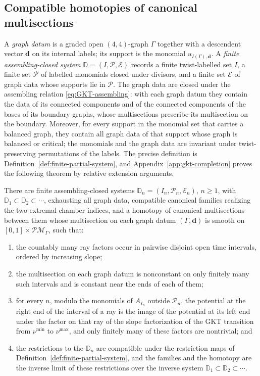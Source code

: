 \subsection{Compatible homotopies of canonical multisections}

A \emph{graph datum} is a graded open $(4,4)$-graph $\Gamma$ together
with a descendent vector $\mathbf d$ on its internal labels; its support is
the monomial $u_{I(\Gamma),\mathbf d}$.  A \emph{finite assembling-closed
system} $\mathbb D=(I,\mathscr P,\mathcal E)$ records a finite twist-labelled
set $I$, a finite set $\mathscr P$ of labelled monomials closed under divisors, and a
finite set $\mathcal E$ of graph data whose supports lie in $\mathscr P$.  The graph
data are closed under the assembling relation \eqref{eq:GKT-assembling}:
with each graph datum they contain the data of its connected components and
of the connected components of the bases of its boundary graphs, whose
multisections prescribe its multisection on the boundary.  Moreover, for
every support in
the monomial set that carries a balanced graph, they contain all graph data
of that support whose graph is balanced or critical; the monomials and the
graph data are invariant under twist-preserving permutations of the labels.
The precise definition is
Definition~\ref{def:finite-partial-system}, and
Appendix~\ref{app:gkt-completion} proves the following theorem by relative
extension arguments.

\begin{theorem}
\label{thm:compatible-GKT-realization}
There are finite assembling-closed systems
$\mathbb D_n=(I_n,\mathscr P_n,\mathcal E_n)$, $n\geq1$, with
$\mathbb D_1\subset\mathbb D_2\subset\cdots$, exhausting all graph data,
compatible canonical families realizing the two extremal chamber indices,
and a homotopy of canonical multisections between them whose multisection
on each graph datum $(\Gamma,\mathbf d)$ is smooth on
$[0,1]\times\mathcal{PM}_\Gamma$, such that:
\begin{enumerate}
\item the countably many ray factors occur in pairwise disjoint open time
intervals, ordered by increasing slope;
\item the multisection on each graph datum is nonconstant on only finitely
many such intervals and is constant near the ends of each of them;
\item for every $n$, modulo the monomials of $A_{I_n}$ outside $\mathscr P_n$, the
potential at the right end of the interval of a ray is the image of the
potential at its left end under the factor on that ray of the slope
factorization \cite[Thm.~1.1 and Prop.~3.1]{wuebben2026boundary} of the GKT transition
from $\nu^{\min}$ to $\nu^{\max}$, and only finitely many of these factors
are nontrivial; and
\item the restrictions to the $\mathbb D_n$ are compatible under the
restriction maps of Definition~\ref{def:finite-partial-system}, and the
families and the homotopy are the inverse limit of these restrictions over
the inverse system $\mathbb D_1\subset\mathbb D_2\subset\cdots$.
\end{enumerate}
\end{theorem}


